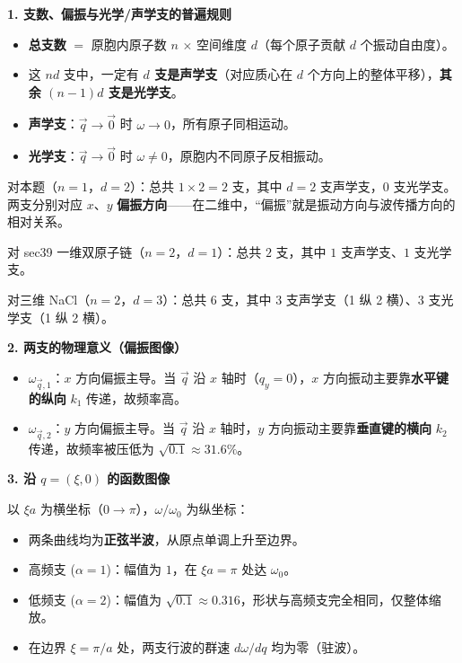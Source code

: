 \begin{insightbox}[物理图像与定性作图]
\textbf{1. 支数、偏振与光学/声学支的普遍规则}

\begin{itemize}
    \item \textbf{总支数} $=$ 原胞内原子数 $n$ $\times$ 空间维度 $d$（每个原子贡献 $d$ 个振动自由度）。
    \item 这 $nd$ 支中，一定有 \textbf{$d$ 支是声学支}（对应质心在 $d$ 个方向上的整体平移），\textbf{其余 $(n-1)d$ 支是光学支}。
    \item \textbf{声学支}：$\vec q\to\vec0$ 时 $\omega\to0$，所有原子同相运动。
    \item \textbf{光学支}：$\vec q\to\vec0$ 时 $\omega\neq0$，原胞内不同原子反相振动。
\end{itemize}

对本题（$n=1$，$d=2$）：总共 $1\times2=2$ 支，其中 $d=2$ 支声学支，$0$ 支光学支。两支分别对应 $x$、$y$ \textbf{偏振方向}——在二维中，``偏振''就是振动方向与波传播方向的相对关系。

对 sec39 一维双原子链（$n=2$，$d=1$）：总共 $2$ 支，其中 $1$ 支声学支、$1$ 支光学支。

对三维 NaCl（$n=2$，$d=3$）：总共 $6$ 支，其中 $3$ 支声学支（1 纵 2 横）、$3$ 支光学支（1 纵 2 横）。

\textbf{2. 两支的物理意义（偏振图像）}

\begin{itemize}
    \item $\omega_{\vec q,1}$：$x$ 方向偏振主导。当 $\vec q$ 沿 $x$ 轴时（$q_y=0$），$x$ 方向振动主要靠\textbf{水平键的纵向} $k_1$ 传递，故频率高。
    \item $\omega_{\vec q,2}$：$y$ 方向偏振主导。当 $\vec q$ 沿 $x$ 轴时，$y$ 方向振动主要靠\textbf{垂直键的横向} $k_2$ 传递，故频率被压低为 $\sqrt{0.1}\approx31.6\%$。
\end{itemize}

\textbf{3. 沿 $q=(\xi,0)$ 的函数图像}

以 $\xi a$ 为横坐标（$0\to\pi$），$\omega/\omega_0$ 为纵坐标：
\begin{itemize}
    \item 两条曲线均为\textbf{正弦半波}，从原点单调上升至边界。
    \item 高频支 ($\alpha=1$)：幅值为 $1$，在 $\xi a=\pi$ 处达 $\omega_0$。
    \item 低频支 ($\alpha=2$)：幅值为 $\sqrt{0.1}\approx0.316$，形状与高频支完全相同，仅整体缩放。
    \item 在边界 $\xi=\pi/a$ 处，两支行波的群速 $d\omega/dq$ 均为零（驻波）。
\end{itemize}


\end{insightbox}
